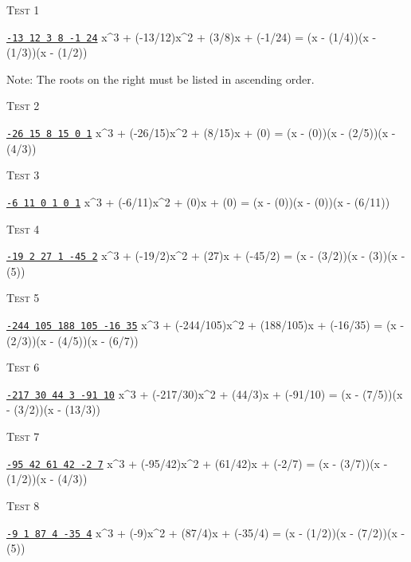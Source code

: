 \textsc{Test 1}
\begin{console}[commandchars=\\\{\}]
\underline{\texttt{-13 12 3 8 -1 24}}
x^3 + (-13/12)x^2 + (3/8)x + (-1/24) = (x - (1/4))(x - (1/3))(x - (1/2))
\end{console}
Note: The roots on the right must be listed in ascending order.


\textsc{Test 2}
\begin{console}[commandchars=\\\{\}]
\underline{\texttt{-26 15 8 15 0 1}}
x^3 + (-26/15)x^2 + (8/15)x + (0) = (x - (0))(x - (2/5))(x - (4/3))
\end{console}

\textsc{Test 3}
\begin{console}[commandchars=\\\{\}]
\underline{\texttt{-6 11 0 1 0 1}}
x^3 + (-6/11)x^2 + (0)x + (0) = (x - (0))(x - (0))(x - (6/11))
\end{console}


\textsc{Test 4}
\begin{console}[commandchars=\\\{\}]
\underline{\texttt{-19 2 27 1 -45 2}}
x^3 + (-19/2)x^2 + (27)x + (-45/2) = (x - (3/2))(x - (3))(x - (5))
\end{console}


\textsc{Test 5}
\begin{console}[fontsize=\small,commandchars=\\\{\}]
\underline{\texttt{-244 105 188 105 -16 35}}
x^3 + (-244/105)x^2 + (188/105)x + (-16/35) = (x - (2/3))(x - (4/5))(x - (6/7))
\end{console}

\textsc{Test 6}
\begin{console}[commandchars=\\\{\}]
\underline{\texttt{-217 30 44 3 -91 10}}
x^3 + (-217/30)x^2 + (44/3)x + (-91/10) = (x - (7/5))(x - (3/2))(x - (13/3)) 
\end{console}


\textsc{Test 7}
\begin{console}[commandchars=\\\{\}]
\underline{\texttt{-95 42 61 42 -2 7}}
x^3 + (-95/42)x^2 + (61/42)x + (-2/7) = (x - (3/7))(x - (1/2))(x - (4/3))
\end{console}


\textsc{Test 8}
\begin{console}[commandchars=\\\{\}]
\underline{\texttt{-9 1 87 4 -35 4}}
x^3 + (-9)x^2 + (87/4)x + (-35/4) = (x - (1/2))(x - (7/2))(x - (5))
\end{console}

